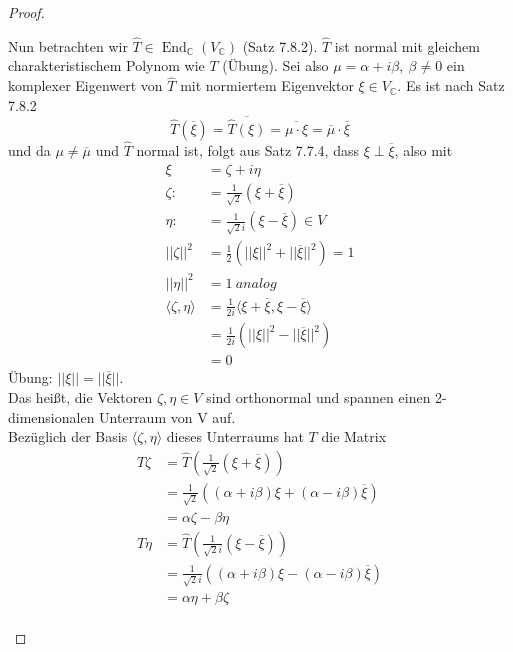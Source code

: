 \documentclass[12pt,a4paper]{article}
\theoremstyle{definition}
\theoremstyle{remark}
\renewcommand{\bar}[1]{\overline{#1}}
\renewcommand{\hat}[1]{\widehat{#1}}
\DeclareMathOperator{\End}{End}
\begin{document}
\begin{proof}
\begin{itemize}
			Nun betrachten wir $\hat{T} \in \End_{\mathbb{C}}(V_{\mathbb{C}})$ (Satz 7.8.2).
			$\hat{T}$ ist normal mit gleichem charakteristischem Polynom wie $T$ (Übung). Sei also $\mu = \alpha + i \beta, \ \beta \neq 0$ ein komplexer Eigenwert von $\hat{T}$ mit normiertem Eigenvektor $\xi \in V_{\mathbb{C}}$. Es ist nach Satz 7.8.2 
			\begin{equation}
				\hat{T}(\overline{\xi})=\overline{\hat{T}(\xi)}= \overline{\mu \cdot \xi} = \overline{\mu} \cdot \overline{\xi}
			\end{equation}
			und da $\mu \neq \bar{\mu}$ und $\hat{T}$ normal ist, folgt aus Satz 7.7.4, dass $\xi \perp \bar{\xi}$, also mit 
			\begin{equation}
				\begin{split}
					\xi &= \zeta + i \eta \\
					\zeta :&= \frac{1}{\sqrt{2}}(\xi + \bar{\xi}) \\
					\eta :&= \frac{1}{\sqrt{2}i}(\xi - \bar{\xi}) \in V \\
					||\zeta||^2&= \frac{1}{2} (||\xi||^2+||\bar{\xi}||^2) =1 \\
					||\eta ||^2 &= 1 \ analog \\
					\langle \zeta, \eta \rangle &= \frac{1}{2i}\langle \xi + \bar{\xi}, \xi - \bar{\xi} \rangle \\
					&= \frac{1}{2i}(||\xi||^2-||\bar{\xi}||^2) \\
					&=0
				\end{split}
			\end{equation}
			Übung: $||\xi||=||\bar{\xi}||$. \\
			Das heißt, die Vektoren $\zeta,\eta \in V$ sind orthonormal und spannen einen 2-dimensionalen Unterraum von V auf. \\
			Bezüglich der Basis $\langle \zeta, \eta \rangle$ dieses Unterraums hat $T$ die Matrix
			\begin{equation}
				\begin{split}
					T\zeta &= \hat{T}\left(\frac{1}{\sqrt{2}}(\xi + \bar{\xi})\right) \\
					&= \frac{1}{\sqrt{2}}((\alpha+i\beta)\xi+(\alpha-i\beta)\bar{\xi}) \\
					&= \alpha\zeta - \beta \eta \\
					T\eta &= \hat{T}\left(\frac{1}{\sqrt{2}i}(\xi-\bar{\xi})\right) \\
					&= \frac{1}{\sqrt{2}i}((\alpha+i\beta)\xi-(\alpha-i\beta)\bar{\xi}) \\
					&= \alpha\eta + \beta\zeta \\

\end{split}
\end{equation}
\end{itemize}
\end{proof}
\end{document}
